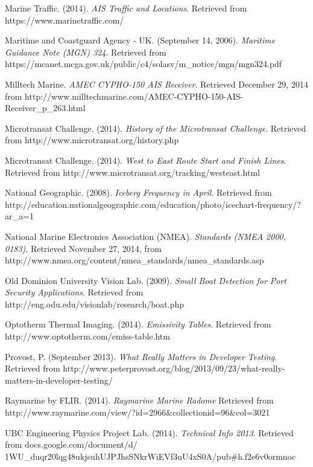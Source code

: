 \begin{thebibliography}{99}
 Marine Traffic. (2014). \textit{AIS Traffic and Locations}. Retrieved from https://www.marinetraffic.com/

 Maritime and Coastguard Agency - UK. (September 14, 2006). \textit{Maritime Guidance Note (MGN) 324}. Retrieved from https://mcanet.mcga.gov.uk/public/c4/solasv/m\_notice/mgn/mgn324.pdf

 Milltech Marine. \textit{AMEC CYPHO-150 AIS Receiver}. Retrieved December 29, 2014 from http://www.milltechmarine.com/AMEC-CYPHO-150-AIS-Receiver\_p\_263.html

 Microtransat Challenge. (2014). \textit{History of the Microtransat Challenge}. Retrieved from http://www.microtransat.org/history.php

 Microtransat Challenge. (2014). \textit{West to East Route Start and Finish Lines}. Retrieved from http://www.microtransat.org/tracking/westeast.html

 National Geographic. (2008). \textit{Iceberg Frequency in April}. Retrieved from http://education.nationalgeographic.com/education/photo/icechart-frequency/?ar\_a=1

 National Marine Electronics Association (NMEA). \textit{Standards (NMEA 2000, 0183)}. Retrieved November 27, 2014, from http://www.nmea.org/content/nmea\_standards/nmea\_standards.asp

 Old Dominion University Vision Lab. (2009). \textit{Small Boat Detection for Port Security Applications}. Retrieved from http://eng.odu.edu/visionlab/research/boat.php

 Optotherm Thermal Imaging. (2014). \textit{Emissivity Tables}. Retrieved from http://www.optotherm.com/emiss-table.htm

 Provost, P. (September 2013). \textit{What Really Matters in Developer Testing}. Retrieved from http://www.peterprovost.org/blog/2013/09/23/what-really-matters-in-developer-testing/

 Raymarine by FLIR. (2014). \textit{Raymarine Marine Radome} Retrieved from http://www.raymarine.com/view/?id=2966\&collectionid=96\&col=3021

 UBC Engineering Physics Project Lab. (2014). \textit{Technical Info 2013}. Retrieved from docs.google.com/document/d/\\1WU\_duqr20lqg48ukjsuhUJPJhsSNkrWiEVf3uU4xS0A/pub\#h.f2e6v0ormnoc


\end{thebibliography}
